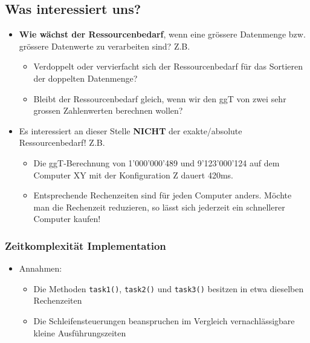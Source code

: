 \subsection*{Was interessiert uns?}
\begin{itemize}[noitemsep,topsep=0pt,leftmargin=*]
    \item \textbf{Wie wächst der Ressourcenbedarf}, wenn eine grössere Datenmenge bzw. grössere Datenwerte zu verarbeiten sind? Z.B.
    \begin{itemize}[noitemsep,topsep=0pt,leftmargin=*]
        \item Verdoppelt oder vervierfacht sich der Ressourcenbedarf für das Sortieren der doppelten Datenmenge?
        \item Bleibt der Ressourcenbedarf gleich, wenn wir den ggT von zwei sehr grossen Zahlenwerten berechnen wollen?
    \end{itemize}
    \item Es interessiert an dieser Stelle \textbf{NICHT} der exakte/absolute Ressourcenbedarf! Z.B.
    \begin{itemize}[noitemsep,topsep=0pt,leftmargin=*]
        \item Die ggT-Berechnung von 1'000'000'489 und 9'123'000'124 auf dem Computer XY mit der Konfiguration Z dauert 420ms.
        \item Entsprechende Rechenzeiten sind für jeden Computer anders. Möchte man die Rechenzeit reduzieren, so lässt sich jederzeit ein schnellerer Computer kaufen!
    \end{itemize}
\end{itemize}

\subsubsection{Zeitkomplexität Implementation}
\begin{itemize}[noitemsep,topsep=0pt,leftmargin=*]
    \item Annahmen:
    \begin{itemize}[noitemsep,topsep=0pt,leftmargin=*]
        \item Die Methoden \texttt{task1()}, \texttt{task2()} und \texttt{task3()} besitzen in etwa dieselben Rechenzeiten
        \item Die Schleifensteuerungen beanspruchen im Vergleich vernachlässigbare kleine Ausführungszeiten
    \end{itemize}
\end{itemize}

